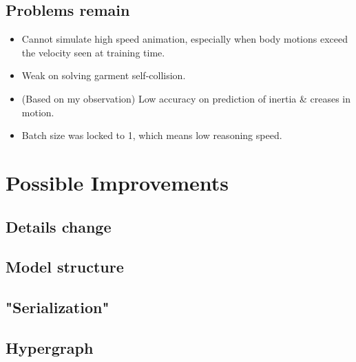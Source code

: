 \documentclass{article}
\begin{document}
\subsection{Problems remain}
\begin{itemize}
    \item Cannot simulate high speed animation, especially when body motions exceed the velocity seen at training time.
    \item Weak on solving garment self-collision.
    \item (Based on my observation) Low accuracy on prediction of inertia \& creases in motion.
    \item Batch size was locked to 1, which means low reasoning speed.
\end{itemize}

\section{Possible Improvements}
\subsection{Details change}
\subsection{Model structure}
\subsection{"Serialization"}
\subsection{Hypergraph}



\end{document}

